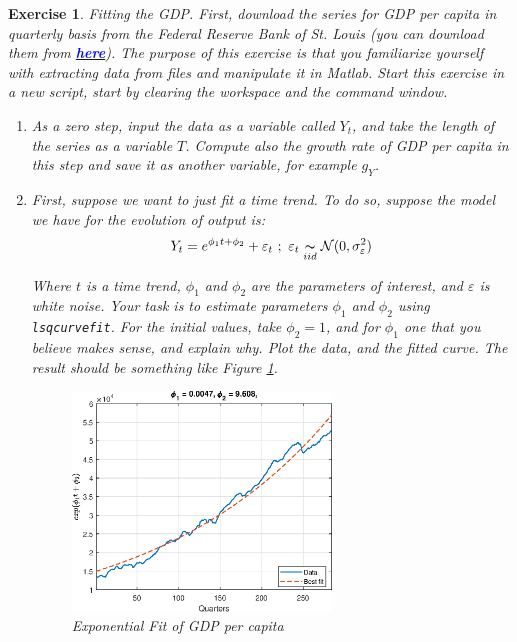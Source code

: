 \documentclass[a4paper,12pt]{article}
\newtheorem{exercise}{Exercise}
\begin{document}
\begin{exercise}
Fitting the GDP. First, download the series for GDP per capita in quarterly basis from the Federal Reserve Bank of St. Louis (you can download them from \href{https://fred.stlouisfed.org/series/A939RX0Q048SBEA}{\textcolor{blue}{\textbf{here}}}). The purpose of this exercise is that you familiarize yourself with extracting data from files and manipulate it in Matlab. Start this exercise in a new script, start by clearing the workspace and the command window.

\begin{enumerate}
	\item As a zero step, input the data as a variable called $Y_t$, and take the length of the series as a variable $T$. Compute also the growth rate of GDP per capita in this step and save it as another variable, for example $g_Y$.
	\item First, suppose we want to just fit a time trend. To do so, suppose the model we have for the evolution of output is:
	\begin{equation}
	Y_t = e^{\phi_1 t + \phi_2} + \varepsilon_t \ ; \ \varepsilon_t \underset{iid}{\thicksim} \mathcal{N}(0,\sigma^2_{\varepsilon})
	\label{model_1}
	\end{equation}
		
Where $t$ is a time trend, $\phi_1$ and $\phi_2$ are the parameters of interest, and $\varepsilon$ is white noise. Your task is to estimate parameters $\phi_1$ and $\phi_2$ using \texttt{lsqcurvefit}. For the initial values, take $\phi_2 = 1$, and for $\phi_1$ one that you believe makes sense, and explain why. Plot the data, and the fitted curve. The result should be something like Figure \ref{exp_fit}.
		
\begin{figure}[htbp]
	\centering
		\includegraphics[width = 0.65\textwidth]{exp_fit.eps}
	\caption{Exponential Fit of GDP per capita}
	\label{exp_fit}
\end{figure} 


\end{enumerate}
\end{exercise}
\end{document}
